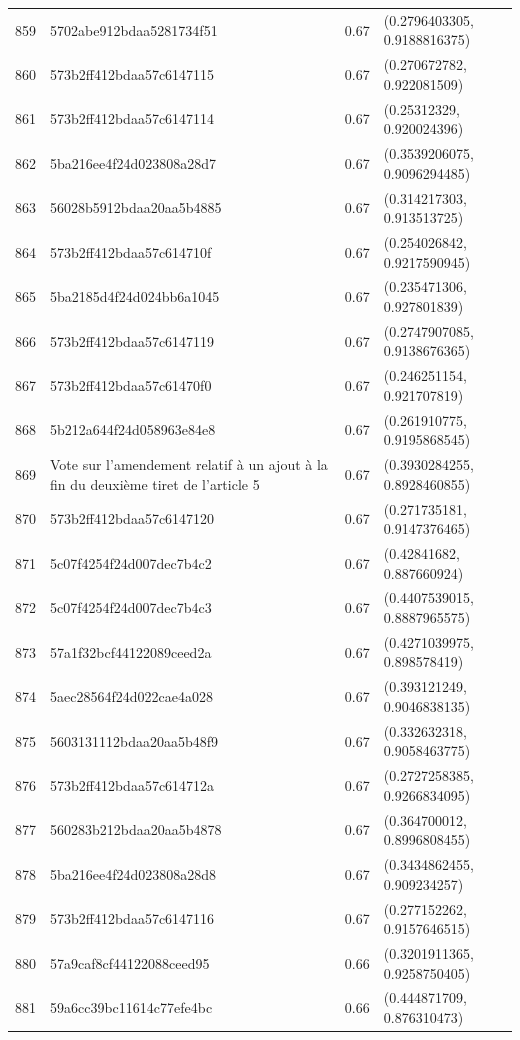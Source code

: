 \begin{table}[ht]
\begin{tabular}{rlrl}
  859 & 5702abe912bdaa5281734f51 & 0.67 & (0.2796403305, 0.9188816375) \\ 
  860 & 573b2ff412bdaa57c6147115 & 0.67 & (0.270672782, 0.922081509) \\ 
  861 & 573b2ff412bdaa57c6147114 & 0.67 & (0.25312329, 0.920024396) \\ 
  862 & 5ba216ee4f24d023808a28d7 & 0.67 & (0.3539206075, 0.9096294485) \\ 
  863 & 56028b5912bdaa20aa5b4885 & 0.67 & (0.314217303, 0.913513725) \\ 
  864 & 573b2ff412bdaa57c614710f & 0.67 & (0.254026842, 0.9217590945) \\ 
  865 & 5ba2185d4f24d024bb6a1045 & 0.67 & (0.235471306, 0.927801839) \\ 
  866 & 573b2ff412bdaa57c6147119 & 0.67 & (0.2747907085, 0.9138676365) \\ 
  867 & 573b2ff412bdaa57c61470f0 & 0.67 & (0.246251154, 0.921707819) \\ 
  868 & 5b212a644f24d058963e84e8 & 0.67 & (0.261910775, 0.9195868545) \\ 
  869 & Vote sur l'amendement relatif à un ajout à la fin du deuxième tiret de l'article 5 & 0.67 & (0.3930284255, 0.8928460855) \\ 
  870 & 573b2ff412bdaa57c6147120 & 0.67 & (0.271735181, 0.9147376465) \\ 
  871 & 5c07f4254f24d007dec7b4c2 & 0.67 & (0.42841682, 0.887660924) \\ 
  872 & 5c07f4254f24d007dec7b4c3 & 0.67 & (0.4407539015, 0.8887965575) \\ 
  873 & 57a1f32bcf44122089ceed2a & 0.67 & (0.4271039975, 0.898578419) \\ 
  874 & 5aec28564f24d022cae4a028 & 0.67 & (0.393121249, 0.9046838135) \\ 
  875 & 5603131112bdaa20aa5b48f9 & 0.67 & (0.332632318, 0.9058463775) \\ 
  876 & 573b2ff412bdaa57c614712a & 0.67 & (0.2727258385, 0.9266834095) \\ 
  877 & 560283b212bdaa20aa5b4878 & 0.67 & (0.364700012, 0.8996808455) \\ 
  878 & 5ba216ee4f24d023808a28d8 & 0.67 & (0.3434862455, 0.909234257) \\ 
  879 & 573b2ff412bdaa57c6147116 & 0.67 & (0.277152262, 0.9157646515) \\ 
  880 & 57a9caf8cf44122088ceed95 & 0.66 & (0.3201911365, 0.9258750405) \\ 
  881 & 59a6cc39bc11614c77efe4bc & 0.66 & (0.444871709, 0.876310473) \\ 

\end{tabular}
\end{table}
